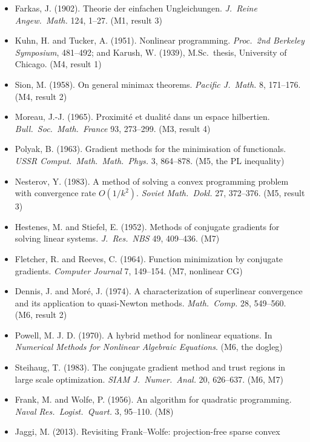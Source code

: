 \documentclass[11pt,a4paper]{article}
\begin{document}
\begin{itemize}[label={}]
\item[{[C1]}] Farkas, J. (1902). Theorie der einfachen Ungleichungen. \emph{J.\ Reine Angew.\
Math.} 124, 1--27. \hfill (M1, result 3)
\item[{[C2]}] Kuhn, H. and Tucker, A. (1951). Nonlinear programming. \emph{Proc.\ 2nd Berkeley
Symposium}, 481--492; and Karush, W. (1939), M.Sc.\ thesis, University of Chicago.
\hfill (M4, result 1)
\item[{[C3]}] Sion, M. (1958). On general minimax theorems. \emph{Pacific J.\ Math.} 8,
171--176. \hfill (M4, result 2)
\item[{[C4]}] Moreau, J.-J. (1965). Proximit\'e et dualit\'e dans un espace hilbertien.
\emph{Bull.\ Soc.\ Math.\ France} 93, 273--299. \hfill (M3, result 4)
\item[{[C5]}] Polyak, B. (1963). Gradient methods for the minimisation of functionals.
\emph{USSR Comput.\ Math.\ Math.\ Phys.} 3, 864--878. \hfill (M5, the PL inequality)
\item[{[C6]}] Nesterov, Y. (1983). A method of solving a convex programming problem with
convergence rate $O(1/k^2)$. \emph{Soviet Math.\ Dokl.} 27, 372--376. \hfill (M5, result 3)
\item[{[C7]}] Hestenes, M. and Stiefel, E. (1952). Methods of conjugate gradients for solving
linear systems. \emph{J.\ Res.\ NBS} 49, 409--436. \hfill (M7)
\item[{[C8]}] Fletcher, R. and Reeves, C. (1964). Function minimization by conjugate gradients.
\emph{Computer Journal} 7, 149--154. \hfill (M7, nonlinear CG)
\item[{[C9]}] Dennis, J. and Mor\'e, J. (1974). A characterization of superlinear convergence
and its application to quasi-Newton methods. \emph{Math.\ Comp.} 28, 549--560.
\hfill (M6, result 2)
\item[{[C10]}] Powell, M. J. D. (1970). A hybrid method for nonlinear equations. In
\emph{Numerical Methods for Nonlinear Algebraic Equations}. \hfill (M6, the dogleg)
\item[{[C11]}] Steihaug, T. (1983). The conjugate gradient method and trust regions in large
scale optimization. \emph{SIAM J.\ Numer.\ Anal.} 20, 626--637. \hfill (M6, M7)
\item[{[C12]}] Frank, M. and Wolfe, P. (1956). An algorithm for quadratic programming.
\emph{Naval Res.\ Logist.\ Quart.} 3, 95--110. \hfill (M8)
\item[{[C13]}] Jaggi, M. (2013). Revisiting Frank--Wolfe: projection-free sparse convex

\end{itemize}
\end{document}

